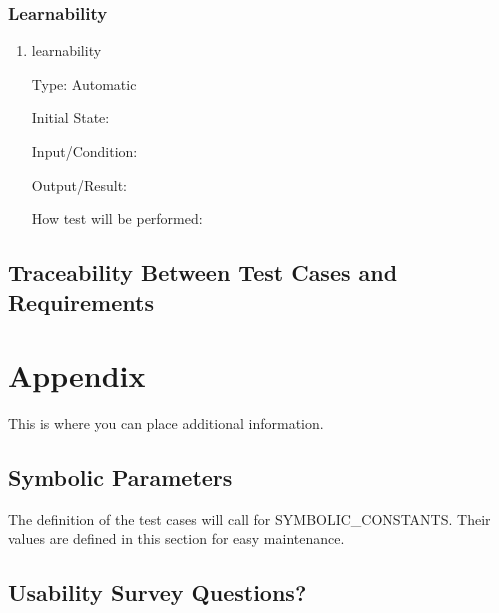 \documentclass[12pt, titlepage]{article}
\begin{document}
\subsubsection{Learnability}

\begin{enumerate}
	
	\item{learnability\\}
	
	Type: Automatic
	
	Initial State: 
	
	Input/Condition: 
	
	Output/Result: 
	
	How test will be performed: 
	
\end{enumerate}

\subsection{Traceability Between Test Cases and Requirements}

				




\newpage

\section{Appendix}

This is where you can place additional information.

\subsection{Symbolic Parameters}

The definition of the test cases will call for SYMBOLIC\_CONSTANTS.
Their values are defined in this section for easy maintenance.

\subsection{Usability Survey Questions?}

\end{document}
